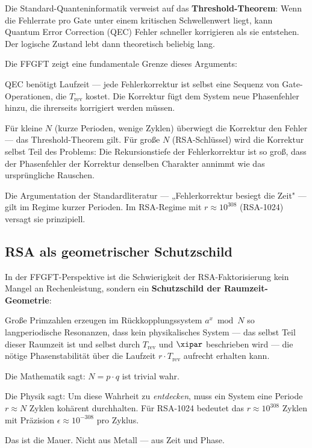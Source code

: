 Die Standard-Quanteninformatik verweist auf das \textbf{Threshold-Theorem}:
Wenn die Fehlerrate pro Gate unter einem kritischen Schwellenwert liegt, kann
Quantum Error Correction (QEC) Fehler schneller korrigieren als sie entstehen.
Der logische Zustand lebt dann theoretisch beliebig lang.

Die FFGFT zeigt eine fundamentale Grenze dieses Arguments:

\begin{important}
QEC benötigt Laufzeit — jede Fehlerkorrektur ist selbst eine Sequenz von
Gate-Operationen, die $T_\text{rev}$ kostet. Die Korrektur fügt dem System
neue Phasenfehler hinzu, die ihrerseits korrigiert werden müssen.

Für kleine $N$ (kurze Perioden, wenige Zyklen) überwiegt die Korrektur den
Fehler — das Threshold-Theorem gilt. Für große $N$ (RSA-Schlüssel) wird die
Korrektur selbst Teil des Problems: Die Rekursionstiefe der Fehlerkorrektur
ist so groß, dass der Phasenfehler der Korrektur denselben Charakter annimmt
wie das ursprüngliche Rauschen.
\end{important}

Die Argumentation der Standardliteratur — „Fehlerkorrektur besiegt die Zeit" —
gilt im Regime kurzer Perioden. Im RSA-Regime mit $r \approx 10^{308}$ (RSA-1024)
versagt sie prinzipiell.

\subsection{RSA als geometrischer Schutzschild}

In der FFGFT-Perspektive ist die Schwierigkeit der RSA-Faktorisierung kein
Mangel an Rechenleistung, sondern ein \textbf{Schutzschild der Raumzeit-Geometrie}:

Große Primzahlen erzeugen im Rückkopplungssystem $a^x \bmod N$ so
langperiodische Resonanzen, dass kein physikalisches System — das selbst Teil
dieser Raumzeit ist und selbst durch $T_\text{rev}$ und $\xipar$ beschrieben wird
— die nötige Phasenstabilität über die Laufzeit $r \cdot T_\text{rev}$ aufrecht
erhalten kann.

\begin{conclusionBox}
Die Mathematik sagt: $N = p \cdot q$ ist trivial wahr.

Die Physik sagt: Um diese Wahrheit zu \emph{entdecken}, muss ein System eine
Periode $r \approx N$ Zyklen kohärent durchhalten. Für RSA-1024 bedeutet das
$r \approx 10^{308}$ Zyklen mit Präzision $\epsilon \approx 10^{-308}$ pro Zyklus.

Das ist die Mauer. Nicht aus Metall — aus Zeit und Phase.
\end{conclusionBox}


